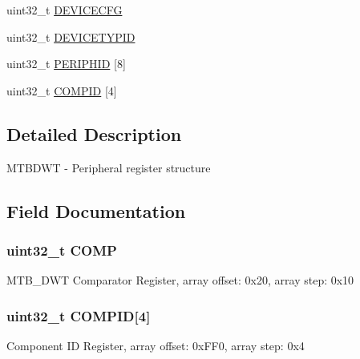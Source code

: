 \begin{DoxyCompactItemize}
\item 
uint32\+\_\+t \hyperlink{struct_m_t_b_d_w_t___mem_map_ad35a23bd184366d37228829c33d5bda6}{D\+E\+V\+I\+C\+E\+C\+F\+G}
\item 
uint32\+\_\+t \hyperlink{struct_m_t_b_d_w_t___mem_map_aa736d6fbfbc7e051f6a2caadd4f17b8f}{D\+E\+V\+I\+C\+E\+T\+Y\+P\+I\+D}
\item 
uint32\+\_\+t \hyperlink{struct_m_t_b_d_w_t___mem_map_ab6fdc70dd1345592145d79d210ee616d}{P\+E\+R\+I\+P\+H\+I\+D} \mbox{[}8\mbox{]}
\item 
uint32\+\_\+t \hyperlink{struct_m_t_b_d_w_t___mem_map_a51d2026476b6e1547beb909d07d4aa32}{C\+O\+M\+P\+I\+D} \mbox{[}4\mbox{]}
\end{DoxyCompactItemize}


\subsection{Detailed Description}
M\+T\+B\+D\+W\+T -\/ Peripheral register structure 

\subsection{Field Documentation}
\hypertarget{struct_m_t_b_d_w_t___mem_map_aa1352530035b6609791c19fda0cc2fb6}{}
\subsubsection[{C\+O\+M\+P}]{\setlength{\rightskip}{0pt plus 5cm}uint32\+\_\+t C\+O\+M\+P}\label{struct_m_t_b_d_w_t___mem_map_aa1352530035b6609791c19fda0cc2fb6}
M\+T\+B\+\_\+\+D\+W\+T Comparator Register, array offset\+: 0x20, array step\+: 0x10 \hypertarget{struct_m_t_b_d_w_t___mem_map_a51d2026476b6e1547beb909d07d4aa32}{}
\subsubsection[{C\+O\+M\+P\+I\+D}]{\setlength{\rightskip}{0pt plus 5cm}uint32\+\_\+t C\+O\+M\+P\+I\+D\mbox{[}4\mbox{]}}\label{struct_m_t_b_d_w_t___mem_map_a51d2026476b6e1547beb909d07d4aa32}
Component I\+D Register, array offset\+: 0x\+F\+F0, array step\+: 0x4 \hypertarget{struct_m_t_b_d_w_t___mem_map_a3be6514ca3bd369fd0de9f8f49471179}{}
